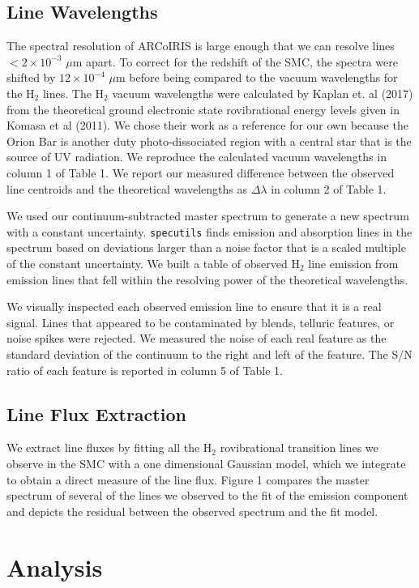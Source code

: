 \documentclass[12pt, letterpaper]{book}
\begin{document}
\section{Line Wavelengths}
The spectral resolution of ARCoIRIS is large enough that we can resolve lines $< 2 \times 10^{-3}$ $\mu$m apart. To correct for the redshift of the SMC, the spectra were shifted by $12 \times 10^{-4}$ $\mu$m before being compared to the vacuum wavelengths for the H$_2$ lines. The H$_2$ vacuum wavelengths were calculated by Kaplan et. al (2017) from the theoretical ground electronic state rovibrational energy levels given in Komasa et al (2011). We chose their work as a reference for our own because the Orion Bar is another duty photo-dissociated region with a central star that is the source of UV radiation. We reproduce the calculated vacuum wavelengths in column 1 of Table 1. We report our measured difference between the observed line centroids and the theoretical wavelengths as $\Delta\lambda$ in column 2 of Table 1.

We used our continuum-subtracted master spectrum to generate a new spectrum with a constant uncertainty. \texttt{specutils} finds emission and absorption lines in the spectrum based on deviations larger than a noise factor that is a scaled multiple of the constant uncertainty. We built a table of observed H$_2$ line emission from emission lines that fell within the resolving power of the theoretical wavelengths.

We visually inspected each observed emission line to ensure that it is a real signal. Lines that appeared to be contaminated by blends, telluric features, or noise spikes were rejected. We measured the noise of each real feature as the standard deviation of the continuum to the right and left of the feature. The S/N ratio of each feature is reported in column 5 of Table 1.

\section{Line Flux Extraction}
We extract line fluxes by fitting all the H$_2$ rovibrational transition lines we observe in the SMC with a one dimensional Gaussian model, which we integrate to obtain a direct measure of the line flux. Figure 1 compares the master spectrum of several of the lines we observed to the fit of the emission component and depicts the residual between the observed spectrum and the fit model.

\chapter{Analysis}
\label{chapter:analysis}
\end{document}
